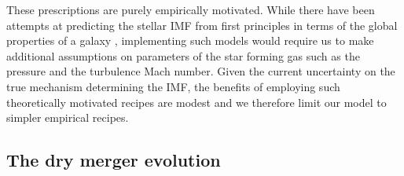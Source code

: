 \documentclass[usenatbib, letters]{mnras}
\begin{document}
These prescriptions are purely empirically motivated. While there have been attempts at predicting the stellar IMF from first principles in terms of the global properties of a galaxy \citep[e.g.][]{Kru11,Hop12}, implementing such models would require us to make additional assumptions on parameters of the star forming gas such as the pressure and the turbulence Mach number.
Given the current uncertainty on the true mechanism determining the IMF, the benefits of employing such theoretically motivated recipes are modest and we therefore limit our model to simpler empirical recipes.


\subsection{The dry merger evolution}
\end{document}

